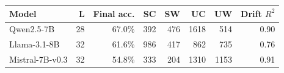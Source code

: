 \begin{tabular}{lrrrrrrr}
\toprule
Model & L & Final acc. & SC & SW & UC & UW & Drift $R^2$ \\
\midrule
Qwen2.5-7B & 28 & 67.0\% & 392 & 476 & 1618 & 514 & 0.90 \\
Llama-3.1-8B & 32 & 61.6\% & 986 & 417 & 862 & 735 & 0.76 \\
Mistral-7B-v0.3 & 32 & 54.8\% & 333 & 204 & 1310 & 1153 & 0.91 \\
\bottomrule
\end{tabular}
